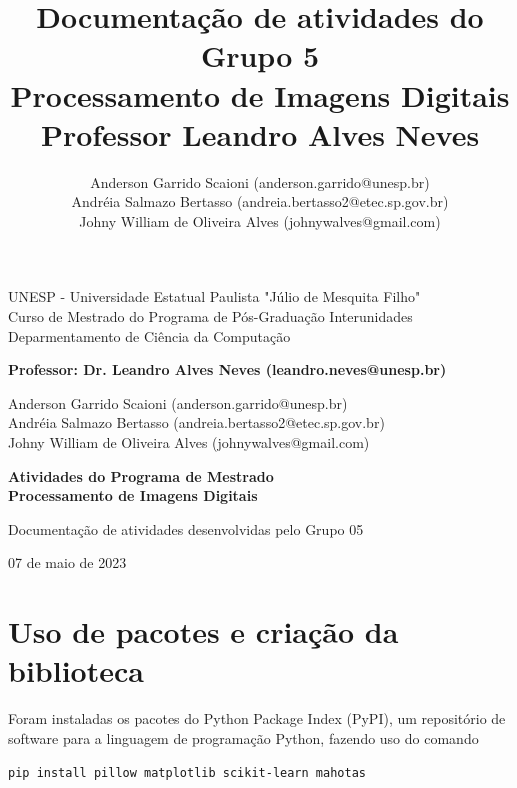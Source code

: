\documentclass[10pt,a4paper]{article}
\title{Documentação de atividades do Grupo 5 \\ Processamento de Imagens Digitais \\ Professor Leandro Alves Neves}
\author{Anderson Garrido Scaioni (anderson.garrido@unesp.br) \\ Andréia Salmazo Bertasso (andreia.bertasso2@etec.sp.gov.br) \\ Johny William de Oliveira Alves (johnywalves@gmail.com)}
\begin{document}
\begin{titlepage}
    \begin{center}
        \vspace*{1cm}

        UNESP - Universidade Estatual Paulista "Júlio de Mesquita Filho"\\
        Curso de Mestrado do Programa de Pós-Graduação Interunidades \\
        Deparmentamento de Ciência da Computação
        
        \vspace{1.5cm}
        
        \textbf{Professor: Dr. Leandro Alves Neves (leandro.neves@unesp.br) }
        
        Anderson Garrido Scaioni (anderson.garrido@unesp.br) \\ 
        Andréia Salmazo Bertasso (andreia.bertasso2@etec.sp.gov.br) \\ 
        Johny William de Oliveira Alves (johnywalves@gmail.com)
               
        \vfill
        
        \textbf{\large
            Atividades do Programa de Mestrado \\
            Processamento de Imagens Digitais
        }
        
        Documentação de atividades desenvolvidas pelo Grupo 05

        \vfill

        07 de maio de 2023
    \end{center}
\end{titlepage}

\pagebreak

\tableofcontents

\pagebreak

\section*{Uso de pacotes e criação da biblioteca}
%

\begin{flushleft}
Foram instaladas os pacotes do Python Package Index (PyPI), um repositório de software para a linguagem de programação Python, fazendo uso do comando
\end{flushleft}

\begin{lstlisting}[language=Bash]
pip install pillow matplotlib scikit-learn mahotas
\end{lstlisting}
\end{document}
